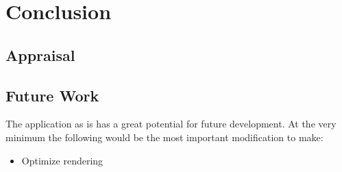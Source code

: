 \section{Conclusion}

\subsection{Appraisal}


\subsection{Future Work}
The application as is has a great potential for future development. At the very minimum the following would be the most important modification to make:
\begin{itemize}
    \item Optimize rendering
\end{itemize}